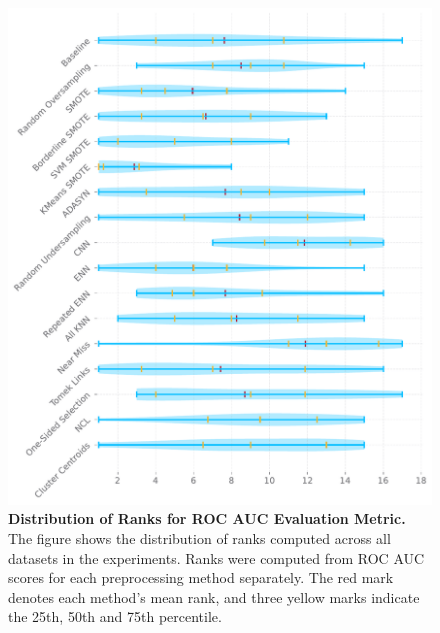 \begin{figure}
    \centering
    \includegraphics[width=\linewidth]{figures/roc_auc_ranks_distribution.pdf}
    \caption{
        \textbf{Distribution of Ranks for ROC AUC Evaluation Metric.} The figure shows the
        distribution of ranks computed across all datasets in the experiments. Ranks were computed
        from ROC AUC scores for each preprocessing method separately. The red mark denotes each
        method’s mean rank, and three yellow marks indicate the 25th, 50th and 75th percentile.
    }
    \label{figure:roc_auc_rank_distributions}
\end{figure}
